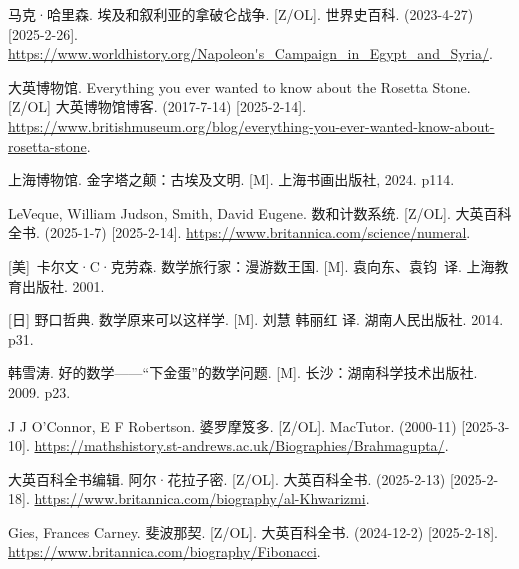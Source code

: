 马克·哈里森. 埃及和叙利亚的拿破仑战争. [Z/OL]. 世界史百科. (2023-4-27) [2025-2-26]. \url{https://www.worldhistory.org/Napoleon's_Campaign_in_Egypt_and_Syria/}.

大英博物馆. Everything you ever wanted to know about the Rosetta Stone. [Z/OL] 大英博物馆博客. (2017-7-14) [2025-2-14]. \url{https://www.britishmuseum.org/blog/everything-you-ever-wanted-know-about-rosetta-stone}.

上海博物馆. 金字塔之颠：古埃及文明. [M]. 上海书画出版社, 2024. p114. %

LeVeque, William Judson, Smith, David Eugene. 数和计数系统. [Z/OL]. 大英百科全书. (2025-1-7) [2025-2-14]. \url{https://www.britannica.com/science/numeral}.

[美]\ 卡尔文·C·克劳森. 数学旅行家：漫游数王国. [M]. 袁向东、袁钧\ 译. 上海教育出版社. 2001. %

[日] 野口哲典. 数学原来可以这样学. [M]. 刘慧 韩丽红 译. 湖南人民出版社. 2014. p31. %

韩雪涛. 好的数学——“下金蛋”的数学问题. [M]. 长沙：湖南科学技术出版社. 2009. p23. %

J J O'Connor, E F Robertson. 婆罗摩笈多. [Z/OL]. MacTutor. (2000-11) [2025-3-10]. \url{https://mathshistory.st-andrews.ac.uk/Biographies/Brahmagupta/}.

大英百科全书编辑. 阿尔·花拉子密. [Z/OL]. 大英百科全书. (2025-2-13) [2025-2-18]. \url{https://www.britannica.com/biography/al-Khwarizmi}.


Gies, Frances Carney. 斐波那契. [Z/OL]. 大英百科全书. (2024-12-2) [2025-2-18]. \url{https://www.britannica.com/biography/Fibonacci}.
